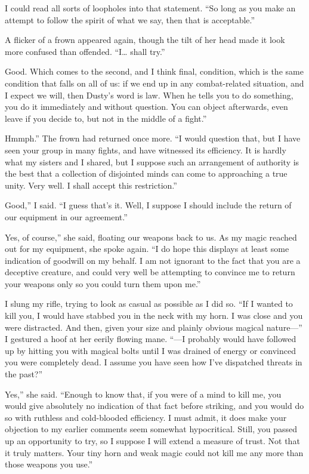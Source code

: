 I could read all sorts of loopholes into that statement. “So long as you make an attempt to follow the spirit of what we say, then that is acceptable.”

A flicker of a frown appeared again, though the tilt of her head made it look more confused than offended. “I… shall try.”

\leavevmode{}Good. Which comes to the second, and I think final, condition, which is the same condition that falls on all of us: if we end up in any combat-related situation, and I expect we will, then Dusty’s word is law. When he tells you to do something, you do it immediately and without question. You can object afterwards, even leave if you decide to, but not in the middle of a fight.”

\leavevmode{}Hmmph.” The frown had returned once more. “I would question that, but I have seen your group in many fights, and have witnessed its efficiency. It is hardly what my sisters and I shared, but I suppose such an arrangement of authority is the best that a collection of disjointed minds can come to approaching a true unity. Very well. I shall accept this restriction.”

\leavevmode{}Good,” I said. “I guess that’s it. Well, I suppose I should include the return of our equipment in our agreement.”

\leavevmode{}Yes, of course,” she said, floating our weapons back to us. As my magic reached out for my equipment, she spoke again. “I do hope this displays at least some indication of goodwill on my behalf. I am not ignorant to the fact that you are a deceptive creature, and could very well be attempting to convince me to return your weapons only so you could turn them upon me.”

I slung my rifle, trying to look as casual as possible as I did so. “If I wanted to kill you, I would have stabbed you in the neck with my horn. I was close and you were distracted. And then, given your size and plainly obvious magical nature—” I gestured a hoof at her eerily flowing mane. “—I probably would have followed up by hitting you with magical bolts until I was drained of energy or convinced you were completely dead. I assume you have seen how I’ve dispatched threats in the past?”

\leavevmode{}Yes,” she said. “Enough to know that, if you were of a mind to kill me, you would give absolutely no indication of that fact before striking, and you would do so with ruthless and cold-blooded efficiency. I must admit, it does make your objection to my earlier comments seem somewhat hypocritical. Still, you passed up an opportunity to try, so I suppose I will extend a measure of trust. Not that it truly matters. Your tiny horn and weak magic could not kill me any more than those weapons you use.”

